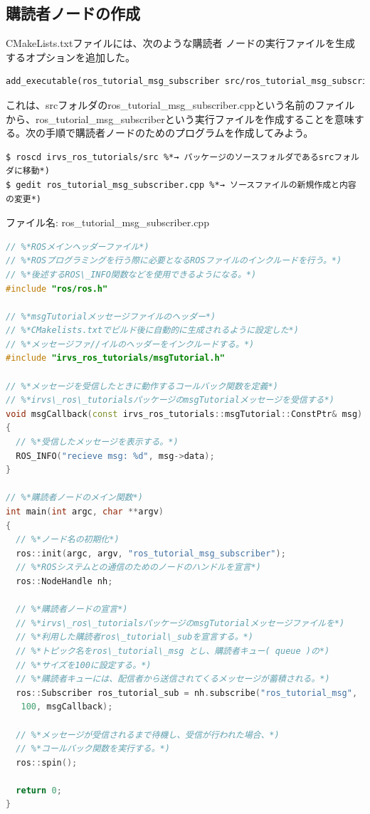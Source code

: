 \subsection{購読者ノードの作成}

CMakeLists.txtファイルには、次のような購読者 ノードの実行ファイルを生成するオプションを追加した。

\begin{lstlisting}[language=make]
add_executable(ros_tutorial_msg_subscriber src/ros_tutorial_msg_subscriber.cpp)
\end{lstlisting}

これは、srcフォルダのros\_tutorial\_msg\_subscriber.cppという名前のファイルから、ros\_tutorial\_msg\_subscriberという実行ファイルを作成することを意味する。次の手順で購読者ノードのためのプログラムを作成してみよう。

\begin{lstlisting}[language=ROS]
$ roscd irvs_ros_tutorials/src %*→ パッケージのソースフォルダであるsrcフォルダに移動*)
$ gedit ros_tutorial_msg_subscriber.cpp %*→ ソースファイルの新規作成と内容の変更*)
\end{lstlisting}

ファイル名: ros\_tutorial\_msg\_subscriber.cpp
\begin{lstlisting}[language=C++]
// %*ROSメインヘッダーファイル*)
// %*ROSプログラミングを行う際に必要となるROSファイルのインクルードを行う。*)
// %*後述するROS\_INFO関数などを使用できるようになる。*)
#include "ros/ros.h"

// %*msgTutorialメッセージファイルのヘッダー*)
// %*CMakelists.txtでビルド後に自動的に生成されるように設定した*)
// %*メッセージファ//イルのヘッダーをインクルードする。*)
#include "irvs_ros_tutorials/msgTutorial.h"

// %*メッセージを受信したときに動作するコールバック関数を定義*)
// %*irvs\_ros\_tutorialsパッケージのmsgTutorialメッセージを受信する*)
void msgCallback(const irvs_ros_tutorials::msgTutorial::ConstPtr& msg)
{
  // %*受信したメッセージを表示する。*)
  ROS_INFO("recieve msg: %d", msg->data);
}

// %*購読者ノードのメイン関数*)
int main(int argc, char **argv)
{
  // %*ノード名の初期化*)
  ros::init(argc, argv, "ros_tutorial_msg_subscriber");
  // %*ROSシステムとの通信のためのノードのハンドルを宣言*)
  ros::NodeHandle nh;

  // %*購読者ノードの宣言*)
  // %*irvs\_ros\_tutorialsパッケージのmsgTutorialメッセージファイルを*)
  // %*利用した購読者ros\_tutorial\_subを宣言する。*)
  // %*トピック名をros\_tutorial\_msg とし、購読者キュー( queue )の*)
  // %*サイズを100に設定する。*)
  // %*購読者キューには、配信者から送信されてくるメッセージが蓄積される。*)
  ros::Subscriber ros_tutorial_sub = nh.subscribe("ros_tutorial_msg",
   100, msgCallback);

  // %*メッセージが受信されるまで待機し、受信が行われた場合、*)
  // %*コールバック関数を実行する。*)
  ros::spin();

  return 0;
}
\end{lstlisting}

